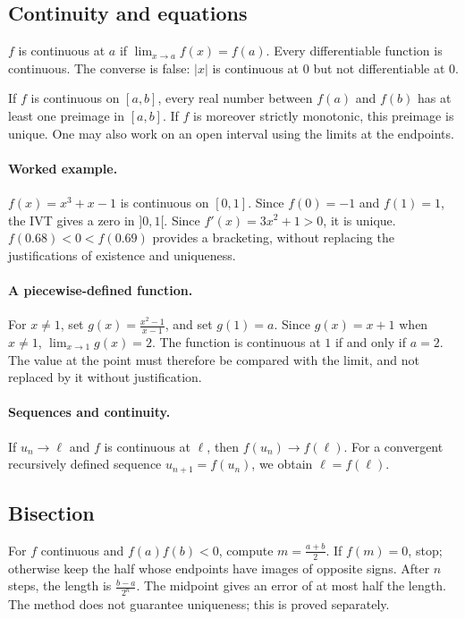 \subsection{Continuity and equations}
$f$ is continuous at $a$ if $\lim_{x\to a}f(x)=f(a)$. Every differentiable function is continuous. The converse is false: $|x|$ is continuous at $0$ but not differentiable at $0$.
\begin{keypoint}
If $f$ is continuous on $[a,b]$, every real number between $f(a)$ and $f(b)$ has at least one preimage in $[a,b]$. If $f$ is moreover strictly monotonic, this preimage is unique. One may also work on an open interval using the limits at the endpoints.
\end{keypoint}
\paragraph{Worked example.} $f(x)=x^3+x-1$ is continuous on $[0,1]$. Since $f(0)=-1$ and $f(1)=1$, the IVT gives a zero in $]0,1[$. Since $f'(x)=3x^2+1>0$, it is unique. $f(\num{0,68})<0<f(\num{0,69})$ provides a bracketing, without replacing the justifications of existence and uniqueness.
\paragraph{A piecewise-defined function.} For $x\ne1$, set $g(x)=\frac{x^2-1}{x-1}$, and set $g(1)=a$. Since $g(x)=x+1$ when $x\ne1$, $\lim_{x\to1}g(x)=2$. The function is continuous at $1$ if and only if $a=2$. The value at the point must therefore be compared with the limit, and not replaced by it without justification.
\paragraph{Sequences and continuity.} If $u_n\to\ell$ and $f$ is continuous at $\ell$, then $f(u_n)\to f(\ell)$. For a convergent recursively defined sequence $u_{n+1}=f(u_n)$, we obtain $\ell=f(\ell)$.
\subsection{Bisection}
For $f$ continuous and $f(a)f(b)<0$, compute $m=\frac{a+b}{2}$. If $f(m)=0$, stop; otherwise keep the half whose endpoints have images of opposite signs. After $n$ steps, the length is $\frac{b-a}{2^n}$. The midpoint gives an error of at most half the length. The method does not guarantee uniqueness; this is proved separately.


